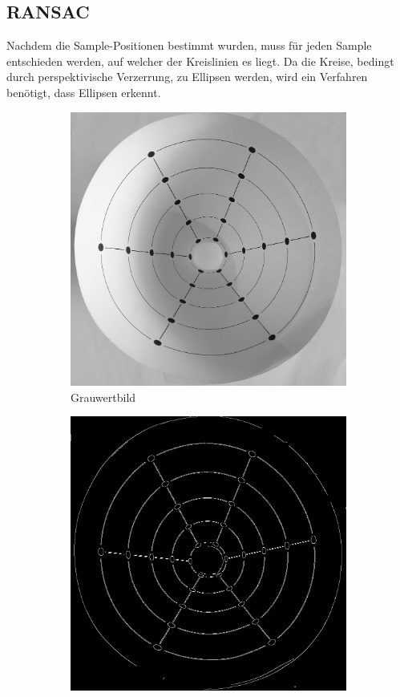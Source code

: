 \subsection{RANSAC}
Nachdem die Sample-Positionen bestimmt wurden, muss für jeden Sample entschieden werden, auf welcher der Kreislinien es liegt. Da die Kreise, bedingt durch perspektivische Verzerrung, zu Ellipsen werden, wird ein Verfahren benötigt, dass Ellipsen erkennt.



\begin{figure}[!htb]
	\centering
	\begin{subfigure}{.5\textwidth}
		\centering
		\includegraphics[width=.9\textwidth]{images/grey.png}
		\caption{Grauwertbild}
		\label{fig:beforeCanny}
	\end{subfigure}%
	\begin{subfigure}{.5\textwidth}
		\centering
		\includegraphics[width=.9\textwidth]{images/canny.png}

\end{subfigure}
\end{figure}

